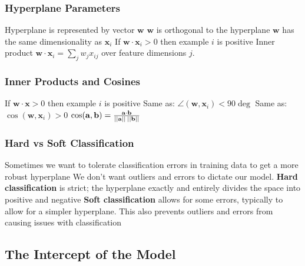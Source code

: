 \documentclass{article}
\renewcommand{\vec}[1]{%
	\mathbf{#1}%
}
\begin{document}
	\subsubsection{Hyperplane Parameters}
	\begin{outline}
		\1 Hyperplane is represented by vector $\vec{w}$
		\1 $\vec{w}$ is orthogonal to the hyperplane
		\1 $\vec{w}$ has the same dimensionality as $\vec{x}_i$
		\1 If $\vec{w} \cdot \vec{x}_i > 0$ then example $i$ is positive
		\1 Inner product $\vec{w} \cdot \vec{x}_i = \sum_jw_jx_{ij}$ over feature dimensions $j$.
	\end{outline}
	\subsubsection{Inner Products and Cosines}
	\begin{outline}
		\1 If $\vec{w} \cdot \vec{x} > 0$ then example $i$ is positive
		\1 Same as: $\angle(\vec{w}, \vec{x}_i) < 90\deg$
		\1 Same as: $\cos(\vec{w}, \vec{x}_i) > 0$ \hspace{3em}$\cos(\vec{a}, \vec{b}) = \frac{\vec{a} \cdot \vec{b}}{||\vec{a}||\:||\vec{b}||}$
	\end{outline}
	\subsubsection{Hard vs Soft Classification}
	\begin{outline}
		\1 Sometimes we want to tolerate classification errors in training data to get a more robust hyperplane
		\1 We don't want outliers and errors to dictate our model.
		\1 \textbf{Hard classification} is strict; the hyperplane exactly and entirely divides the space into positive and negative
		\1 \textbf{Soft classification} allows for some errors, typically to allow for a simpler hyperplane. This also prevents outliers and errors from causing issues with classification
	\end{outline}
	\subsection{The Intercept of the Model}
\end{document}
